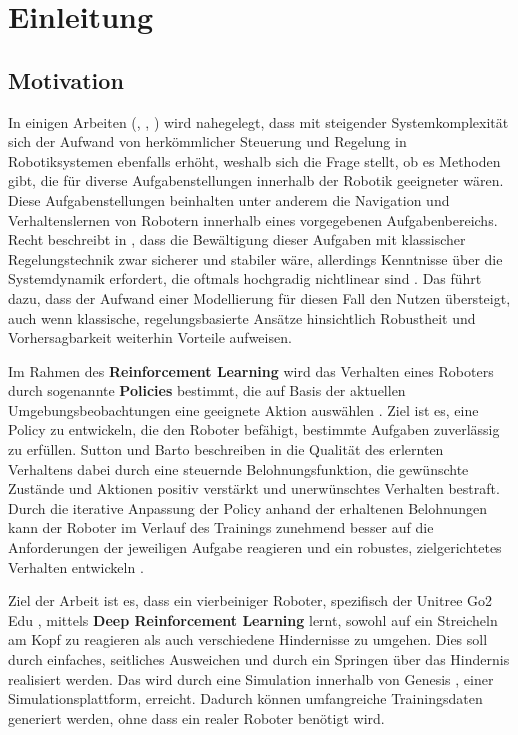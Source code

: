 \chapter{Einleitung}\label{ch:intro}

\section{Motivation}
In einigen Arbeiten (\cite{tangDeepReinforcementLearning2024}, \cite{kormushevReinforcementLearningRobotics2013}, \cite{bussolaGuidedReinforcementLearning2025}) wird nahegelegt, dass mit steigender Systemkomplexität sich der Aufwand von herkömmlicher Steuerung und Regelung in Robotiksystemen ebenfalls erhöht, weshalb sich die Frage stellt, ob es Methoden gibt, die für diverse Aufgabenstellungen innerhalb der Robotik geeigneter wären. \newline
Diese Aufgabenstellungen beinhalten unter anderem die Navigation und Verhaltenslernen von Robotern innerhalb eines vorgegebenen Aufgabenbereichs. Recht beschreibt in \cite{rechtTourReinforcementLearning2018}, dass die Bewältigung dieser Aufgaben mit klassischer Regelungstechnik zwar sicherer und stabiler wäre, allerdings Kenntnisse über die Systemdynamik erfordert, die oftmals hochgradig nichtlinear sind \cite{sutton2018reinforcement, Kober_IJRR_2013}. Das führt dazu, dass der Aufwand einer Modellierung für diesen Fall den Nutzen übersteigt, auch wenn klassische, regelungsbasierte Ansätze hinsichtlich Robustheit und Vorhersagbarkeit weiterhin Vorteile aufweisen.

Im Rahmen des \textbf{Reinforcement Learning} wird das Verhalten eines Roboters durch sogenannte \textbf{Policies} bestimmt, die auf Basis der aktuellen Umgebungsbeobachtungen eine geeignete Aktion auswählen \cite{hwangboLearningAgileDynamic2019, levineEndtoEndTrainingDeep2016}. Ziel ist es, eine Policy zu entwickeln, die den Roboter befähigt, bestimmte Aufgaben zuverlässig zu erfüllen. Sutton und Barto beschreiben in \cite{sutton2018reinforcement} die Qualität des erlernten Verhaltens dabei durch eine steuernde Belohnungsfunktion, die gewünschte Zustände und Aktionen positiv verstärkt und unerwünschtes Verhalten bestraft. Durch die iterative Anpassung der Policy anhand der erhaltenen Belohnungen kann der Roboter im Verlauf des Trainings zunehmend besser auf die Anforderungen der jeweiligen Aufgabe reagieren und ein robustes, zielgerichtetes Verhalten entwickeln \cite{silverRewardEnough2021, zhangORSOAcceleratingReward2025}.

Ziel der Arbeit ist es, dass ein vierbeiniger Roboter, spezifisch der Unitree Go2 Edu \cite{unitreeGo2Unitree2023}, mittels \textbf{Deep Reinforcement Learning} lernt, sowohl auf ein Streicheln am Kopf zu reagieren als auch verschiedene Hindernisse zu umgehen. Dies soll durch einfaches, seitliches Ausweichen und durch ein Springen über das Hindernis realisiert werden. Das wird durch eine Simulation innerhalb von Genesis \cite{authorsGenesisGenerativeUniversal2024}, einer Simulationsplattform, erreicht. Dadurch können umfangreiche Trainingsdaten generiert werden, ohne dass ein realer Roboter benötigt wird.

